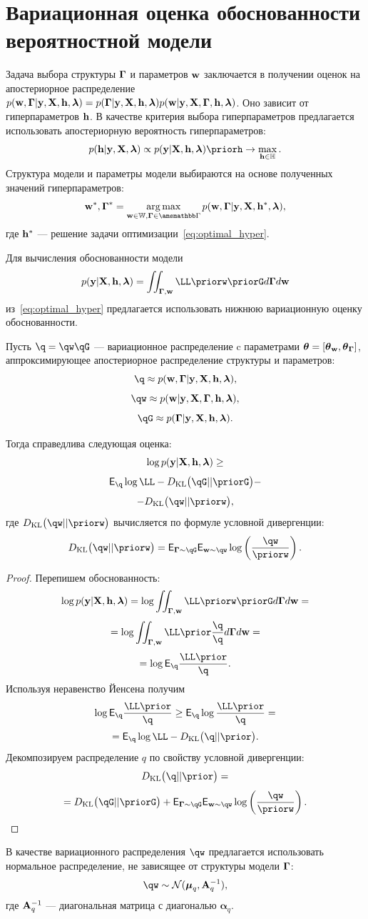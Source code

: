 \section{Вариационная оценка обоснованности вероятностной модели}
Задача выбора структуры $\boldsymbol{\Gamma}$ и параметров $\mathbf{w}$ заключается в получении оценок на апостериорное распределение $p(\mathbf{w}, \boldsymbol{\Gamma}|\mathbf{y}, \mathbf{X}, \mathbf{h},\boldsymbol{\lambda}) = p(\boldsymbol{\Gamma}|\mathbf{y}, \mathbf{X}, \mathbf{h},\boldsymbol{\lambda})p(\mathbf{w}|\mathbf{y}, \mathbf{X}, \boldsymbol{\Gamma}, \mathbf{h},\boldsymbol{\lambda})$. Оно зависит от гиперпараметров $\mathbf{h}$. 
В качестве критерия выбора гиперпараметров предлагается использовать апостериорную вероятность гиперпараметров:
\begin{equation}
\label{eq:optimal_hyper}
    \posth \propto \EV \priorh \to \max_{\h \in \Hb}.
\end{equation}
Структура модели и параметры модели выбираются на основе полученных значений гиперпараметров:
\[
    \w^*,\G^* = \argmax_{\w \in \Wb, \G \in \Gb} p(\w, \G|\y, \X, \h^*, \lam ),
\]
где $\mathbf{h}^*$ --- решение задачи оптимизации~\eqref{eq:optimal_hyper}.

Для вычисления обоснованности модели $$\EV = \iint_{\G, \w}\LL \priorw \priorG d\G d\w$$ из~\eqref{eq:optimal_hyper} предлагается использовать нижнюю вариационную оценку обоснованности.

\begin{theorem}
Пусть $\q = \qw \qG$ --- вариационное распределение c параметрами $\boldsymbol{\theta}= [\boldsymbol{\theta}_\mathbf{w}, \boldsymbol{\theta}_{\boldsymbol{\Gamma}} ]$, аппроксимирующее апостериорное распределение структуры и параметров:
\[
    \q \approx \post,
\]
\[
    \qw  \approx \postw,
\]
\[
    \qG \approx \postG.
\]

Тогда справедлива следующая оценка:
\begin{equation}
\label{eq:full_elbo}
\log p(\mathbf{y}|\mathbf{X}, \mathbf{h},\boldsymbol{\lambda}) \geq
\end{equation}
\[
 \E_{\q}  \log \LL - \KL{\qG}{\priorG} - 
\]
\[
 - \KL{\qw}{\priorw},
\]
где $\KL{\qw}{\priorw}$ вычисляется по формуле условной дивергенции:
\[
\KL{\qw}{\priorw} = \E_{\G \sim \qG} \E_{\w \sim \qw} \log \left(\frac{\qw}{\priorw}\right).
\]
\end{theorem}

\begin{proof}
Перепишем обоснованность:
\[
\log \EV  =  \log \iint_{\G,\w} \LL \priorw \priorG d\G d\w  =
\]
\[
   = \log\iint_{\G,\w} \LL \prior  \frac{\q}{\q}d\G d\w =
\]
\[
  =  \log \E_{\q} \frac{\LL \prior}{\q}.
\]
Используя неравенство Йенсена получим 
\[
 \log \E_{\q} \frac{\LL \prior}{\q} \geq  \E_{\q}\log \frac{\LL \prior}{\q} = 
\]
\[
 =  \E_{\q} \log \LL - \KL{\q}{\prior}.
\]
Декомпозируем распределение $q$ по свойству условной дивергенции:
\[
\KL{\q}{\prior} = 
\]
\begin{equation}
\label{eq:kl_full}
= \KL{\qG}{\priorG} + \E_{\G \sim \qG} \E_{\w \sim \qw} \log \left(\frac{\qw}{\priorw}\right).    
\end{equation}
\end{proof}
В качестве вариационного распределения $\qw$ предлагается использовать нормальное распределение, не зависящее от структуры модели $\boldsymbol{\Gamma}$:
\[
    \qw  \sim \mathcal{N}(\boldsymbol{\mu}_q, \A_q^{-1}), 
\]
где $\mathbf{A}_q^{-1}$ --- диагональная матрица с диагональю $\boldsymbol{\alpha}_q$.

